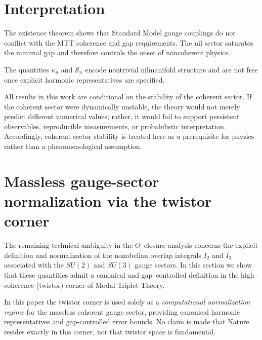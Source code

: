\documentclass[11pt]{article}
\begin{document}
\section{Interpretation}

The existence theorem shows that Standard Model gauge couplings
do not conflict with the MTT coherence and gap requirements.
The nil sector saturates the minimal gap and therefore controls
the onset of noncoherent physics.

\begin{remark}
The quantities $\kappa_n$ and $\mathcal{S}_n$ encode nontrivial
nilmanifold structure and are not free once explicit harmonic
representatives are specified.
\end{remark}

\begin{remark}
All results in this work are conditional on the stability of the coherent
sector.
If the coherent sector were dynamically unstable, the theory would not merely
predict different numerical values; rather, it would fail to support persistent
observables, reproducible measurements, or probabilistic interpretation.
Accordingly, coherent sector stability is treated here as a prerequisite for
physics rather than a phenomenological assumption.
\end{remark}

\section{Massless gauge-sector normalization via the twistor corner}

The remaining technical ambiguity in the $\Theta$--closure analysis concerns
the explicit definition and normalization of the nonabelian overlap integrals
$I_2$ and $I_3$ associated with the $SU(2)$ and $SU(3)$ gauge sectors.
In this section we show that these quantities admit a canonical and
gap--controlled definition in the high--coherence (twistor) corner of
Modal Triplet Theory.

\begin{remark}
In this paper the twistor corner is used solely as a \emph{computational normalization regime}
for the massless coherent gauge sector, providing canonical harmonic representatives and
gap-controlled error bounds. No claim is made that Nature resides exactly in this corner,
nor that twistor space is fundamental.
\end{remark}
\end{document}

